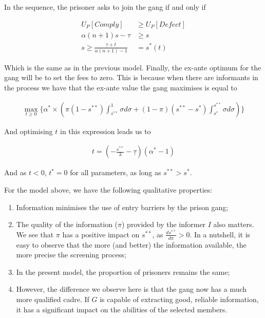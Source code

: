\documentclass[a4paper,12pt]{article}
\begin{document}
In the sequence, the prisoner asks to join the gang if and only if

\begin{equation}
\begin{split}
U_P[Comply] &\geq U_P[Defect]\\
\alpha (n + 1) s - \tau &\geq s \\
s \geq \frac{\underline{\tau}+t}{\alpha (n+1) - 1} &= s^*(t)
\end{split}
\end{equation}

Which is the same as in the previous model. Finally, the ex-ante optimum for the gang will be to set the fees to zero. This is because when there are informants in the process we have that the ex-ante value the gang maximises is equal to 

\begin{equation}
\begin{split}
\max_{t \geq 0} \{ \alpha^* \times (\pi(1-s^{**})\int_{s^{**}}^1 \sigma d\sigma + (1-\pi)(s^{**}-s^{*})\int_{s^{*}}^{s^{**}} \sigma d\sigma ) \}
\end{split}
\end{equation}

And optimising $t$ in this expression leads us to 

\begin{align}
t = \left(-\frac{s^{**}}{3} - \underline{\tau} \right) (\alpha^*-1)
\end{align}

And as $t<0$, $t^*=0$ for all parameters, as long as $s^{**}>s^*$.

For the model above, we have the following qualitative properties:

\begin{enumerate}
\item Information minimises the use of entry barriers by the prison gang;

\item The quality of the information ($\pi$) provided by the informer $I$ also matters. We see that $\pi$ has a positive impact on $s^{**}$, as $\frac{ds^{**}}{d\pi} > 0$. In a nutshell, it is easy to observe that the more (and better) the information available, the more precise the screening process;

\item In the present model, the proportion of prisoners remains the same;

\item However, the difference we observe here is that the gang now has a much more qualified cadre. If $G$ is capable of extracting good, reliable information, it has a significant impact on the abilities of the selected members.
\end{enumerate}
\end{document}
